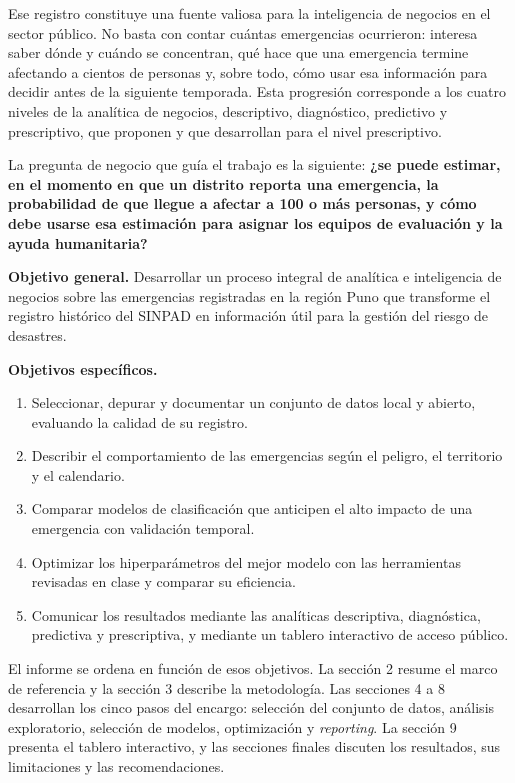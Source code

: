 \documentclass[12pt,a4paper]{article}
\begin{document}
Ese registro constituye una fuente valiosa para la inteligencia de negocios en el sector público. No basta con
contar cuántas emergencias ocurrieron: interesa saber dónde y cuándo se concentran, qué hace que una emergencia
termine afectando a cientos de personas y, sobre todo, cómo usar esa información para decidir antes de la
siguiente temporada. Esta progresión corresponde a los cuatro niveles de la analítica de negocios, descriptivo,
diagnóstico, predictivo y prescriptivo, que proponen \citet{delen2018} y que \citet{lepenioti2020} desarrollan
para el nivel prescriptivo.

La pregunta de negocio que guía el trabajo es la siguiente: \textbf{¿se puede estimar, en el momento en que un
distrito reporta una emergencia, la probabilidad de que llegue a afectar a 100 o más personas, y cómo debe usarse
esa estimación para asignar los equipos de evaluación y la ayuda humanitaria?}

\noindent\textbf{Objetivo general.} Desarrollar un proceso integral de analítica e inteligencia de negocios sobre
las emergencias registradas en la región Puno que transforme el registro histórico del SINPAD en información útil
para la gestión del riesgo de desastres.

\noindent\textbf{Objetivos específicos.}
\begin{enumerate}[leftmargin=22pt]
\item Seleccionar, depurar y documentar un conjunto de datos local y abierto, evaluando la calidad de su registro.
\item Describir el comportamiento de las emergencias según el peligro, el territorio y el calendario.
\item Comparar modelos de clasificación que anticipen el alto impacto de una emergencia con validación temporal.
\item Optimizar los hiperparámetros del mejor modelo con las herramientas revisadas en clase y comparar su eficiencia.
\item Comunicar los resultados mediante las analíticas descriptiva, diagnóstica, predictiva y prescriptiva, y
mediante un tablero interactivo de acceso público.
\end{enumerate}

El informe se ordena en función de esos objetivos. La sección 2 resume el marco de referencia y la sección 3
describe la metodología. Las secciones 4 a 8 desarrollan los cinco pasos del encargo: selección del conjunto de
datos, análisis exploratorio, selección de modelos, optimización y \emph{reporting}. La sección 9 presenta el
tablero interactivo, y las secciones finales discuten los resultados, sus limitaciones y las recomendaciones.
\end{document}
